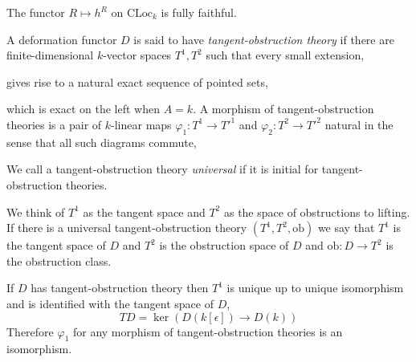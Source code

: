 \documentclass[12pt]{article}
\newcommand{\CLoc}{\mathrm{CLoc}}
\newcommand{\ob}{\mathrm{ob}}
\begin{document}
\begin{prop}
The functor $R \mapsto h^R$ on $\CLoc_k$ is fully faithful.
\end{prop}


\begin{defn}
A deformation functor $D$ is said to have \textit{tangent-obstruction theory} if there are finite-dimensional $k$-vector spaces $T^1, T^2$ such that every small extension,
\begin{center}
\end{center}
gives rise to a natural exact sequence of pointed sets,
\begin{center}
\end{center}
which is exact on the left when $A = k$. A morphism of tangent-obstruction theories is a pair of $k$-linear maps $\varphi_1 : T^1 \to T'^1$ and $\varphi_2 : T^2 \to T'^2$ natural in the sense that all such diagrams commute,
\begin{center}
\end{center}
We call a tangent-obstruction theory \textit{universal} if it is initial for tangent-obstruction theories.
\end{defn}

\begin{rmk}
We think of $T^1$ as the tangent space and $T^2$ as the space of obstructions to lifting. If there is a universal tangent-obstruction theory $(T^1, T^2, \ob)$ we say that $T^1$ is the tangent space of $D$ and $T^2$ is the obstruction space of $D$ and $\ob : D \to T^2$ is the obstruction class.
\end{rmk}

\begin{prop}
If $D$ has tangent-obstruction theory then $T^1$ is unique up to unique isomorphism and is identified with the tangent space of $D$,
\[ T D = \ker{(D(k[\epsilon]) \to D(k))} \]
Therefore $\varphi_1$ for any morphism of tangent-obstruction theories is an isomorphism.
\end{prop}
\end{document}

